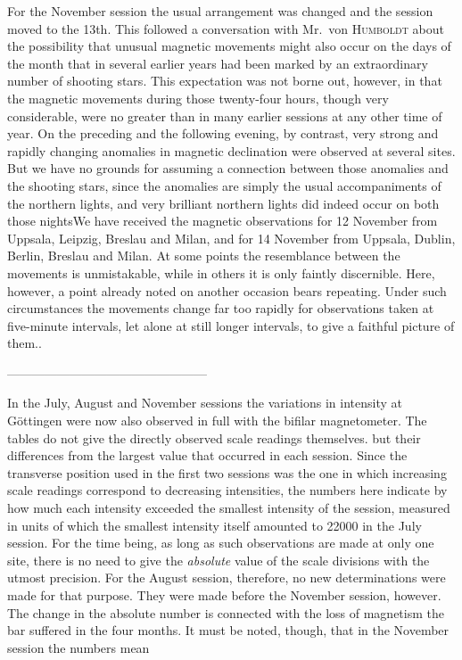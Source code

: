 For the November session the usual arrangement was changed and the session moved to the 13th. This followed a conversation with Mr.\ von \textsc{Humboldt} about the possibility that unusual magnetic movements might also occur on the days of the month that in several earlier years had been marked by an extraordinary number of shooting
stars. This expectation was not borne out, however, in that the magnetic movements during those twenty-four hours, though very considerable, were no greater than in many earlier sessions at any other time of year. On the preceding and the following evening, by contrast, very strong and rapidly changing anomalies in magnetic declination were observed at several sites. But we have no grounds for assuming a connection between those anomalies and the shooting stars, since the anomalies are simply the usual accompaniments of the northern lights, and very brilliant northern lights did indeed occur on both those nights\expandafter\def\csname HistoricalNoteText583\endcsname{We have received the magnetic observations for 12 November from Uppsala, Leipzig, Breslau and Milan, and for 14 November from Uppsala, Dublin, Berlin, Breslau and Milan. At some points the resemblance between the movements is unmistakable, while in others it is only faintly discernible. Here, however, a point already noted on another occasion bears repeating. Under such circumstances the movements change far too rapidly for observations taken at five-minute intervals, let alone at still longer intervals, to give a faithful picture of them.}.
\begin{center}\small
---\enspace---\enspace---\enspace---\enspace---\enspace---\enspace---\enspace---\enspace---\enspace---\enspace---\enspace---\enspace---\enspace---\enspace---\enspace---
\end{center}
In the July, August and November sessions the variations in intensity at Göttingen were now also observed in full with the bifilar magnetometer. The tables do not give the directly observed scale readings themselves. but their differences from the largest value that occurred in each session. Since the transverse position used in the first two sessions was the one in which increasing scale readings correspond to decreasing intensities, the numbers here indicate by how much each intensity exceeded the smallest intensity of the session, measured in units of which the smallest intensity itself amounted to 22000 in the July session. For the time being, as long as such observations are made at only one site, there is no need to give the \textit{absolute} value of the scale divisions with the utmost precision. For the August session, therefore, no new determinations were made for that purpose. They were made before the November session, however. The change in the absolute number is connected with the loss of magnetism the bar suffered in the four months. It must be noted, though, that in the November session the numbers mean
